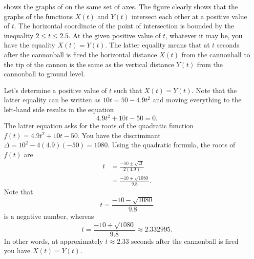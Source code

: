 \documentclass[a4paper,oneside,12pt]{article}
\begin{document}
\begin{problem}
{\begin{solution}
 shows the graphs of
on the same set of axes.  The figure clearly shows that the graphs of
the functions $X(t)$ and $Y(t)$ intersect each other at a positive
value of $t$.  The horizontal coordinate of the point of intersection
is bounded by the inequality $2 \leq t \leq 2.5$.  At the given
positive value of $t$, whatever it may be, you have the equality
$X(t) = Y(t)$.  The latter equality means that at $t$ seconds after
the cannonball is fired the horizontal distance $X(t)$ from the
cannonball to the tip of the cannon is the same as the vertical
distance $Y(t)$ from the cannonball to ground level.

Let's determine a positive value of $t$ such that $X(t) = Y(t)$.  Note
that the latter equality can be written as
$10t = 50 - 4.9t^2$ and moving everything to the left-hand side
results in the equation
\[
4.9t^2 + 10t - 50
=
0.
\]
The latter equation asks for the roots of the quadratic function
$f(t) = 4.9t^2 + 10t - 50$.  You have the discriminant
$\Delta = 10^2 - 4(4.9)(-50) = 1080$.  Using the quadratic formula,
the roots of $f(t)$ are
\begin{align*}
t
&=
\frac{
  -10 \pm \sqrt{\Delta}
}{
  2(4.9)
} \\[4pt]
&=
\frac{
  -10 \pm \sqrt{1080}
}{
  9.8
}.
\end{align*}
Note that
\[
t
=
\frac{
  -10 - \sqrt{1080}
}{
  9.8
}
\]
is a negative number, whereas
\[
t
=
\frac{
  -10 + \sqrt{1080}
}{
  9.8
}
\approx
2.332995.
\]
In other words, at approximately $t \approx 2.33$ seconds after the
cannonball is fired you have $X(t) = Y(t)$.
\end{solution}
}{}


\end{problem}
\end{document}
